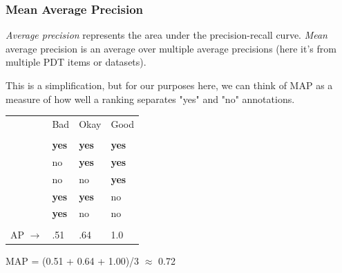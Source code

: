 \documentclass[xcolor={dvipsnames}]{beamer}
\begin{document}

\begin{frame}
\frametitle{Mean Average Precision}
\small
\textit{Average precision} represents the area under the precision-recall curve. \textit{Mean} average precision is an average over multiple average precisions (here it's from multiple PDT items or datasets). \\

\vspace{.8em}

This is a simplification, but for our purposes here, we can think of MAP as a measure of how well a ranking separates "yes" and "no" annotations. \\

\begin{table}[htb!]
\begin{center}
\setlength{\tabcolsep}{.35em}
\begin{tabular}{l|l||l||l|}
\cline{2-4}
& Bad & Okay & Good \\
\cline{2-4}
\multicolumn{4}{l}{}  \\
\cline{2-4}
& \textbf{yes} & \textbf{yes} & \textbf{yes} \\
\cline{2-4}
& no & \textbf{yes} & \textbf{yes} \\
\cline{2-4}
& no & no & \textbf{yes} \\
\cline{2-4}
& \textbf{yes} & \textbf{yes} & no \\
\cline{2-4}
& \textbf{yes} & no & no \\
\cline{2-4}
\multicolumn{4}{l}{}  \\
\cline{2-4}
AP $\rightarrow$ & .51 & .64 & 1.0 \\
\cline{2-4}
\end{tabular}
\end{center}
\end{table}

\hspace{8em}MAP = (0.51 + 0.64 + 1.00)/3 $\approx$ 0.72

\end{frame}
\end{document}
